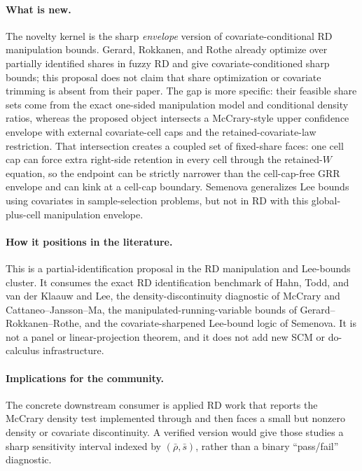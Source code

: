 \documentclass[11pt]{article}
\theoremstyle{definition}
\theoremstyle{plain}
\theoremstyle{remark}
\begin{document}
\paragraph{What is new.}
The novelty kernel is the sharp \emph{envelope} version of covariate-conditional RD
manipulation bounds.  Gerard, Rokkanen, and Rothe already optimize over partially identified
shares in fuzzy RD and give covariate-conditioned sharp bounds; this proposal does not claim
that share optimization or covariate trimming is absent from their paper.  The gap is more
specific: their feasible share sets come from the exact one-sided manipulation model and
conditional density ratios, whereas the proposed object intersects a McCrary-style upper
confidence envelope with external covariate-cell caps and the retained-covariate-law
restriction.  That intersection creates a coupled set of fixed-share faces: one cell cap
can force extra right-side retention in every cell through the retained-\(W\) equation, so
the endpoint can be strictly narrower than the cell-cap-free GRR envelope and can kink at a
cell-cap boundary.  Semenova generalizes Lee bounds using covariates in
sample-selection problems, but not in RD with this global-plus-cell manipulation envelope.

\paragraph{How it positions in the literature.}
This is a partial-identification proposal in the RD manipulation and Lee-bounds cluster.
It consumes the exact RD identification benchmark of Hahn, Todd, and van der Klaauw and
Lee, the density-discontinuity diagnostic of McCrary and Cattaneo--Jansson--Ma, the
manipulated-running-variable bounds of Gerard--Rokkanen--Rothe, and the covariate-sharpened
Lee-bound logic of Semenova.  It is not a panel or linear-projection theorem, and it does
not add new SCM or do-calculus infrastructure.

\paragraph{Implications for the community.}
The concrete downstream consumer is applied RD work that reports the McCrary density test
implemented through \citet{CattaneoJanssonMa2020} and then faces a small but nonzero density
or covariate discontinuity.  A verified version would give those studies a sharp sensitivity
interval indexed by \((\bar\rho,\bar s)\), rather than a binary ``pass/fail'' diagnostic.
\end{document}
